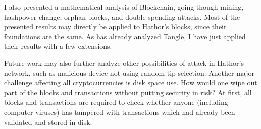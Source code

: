 I also presented a mathematical analysis of Blockchain, going though mining, hashpower change, orphan blocks, and double-spending attacks. Most of the presented results may directly be applied to Hathor's blocks, since their foundations are the same. As \citet{tangle2016} has already analyzed Tangle, I have just applied their results with a few extensions.

Future work may also further analyze other possibilities of attack in Hathor's network, such as malicious device not using random tip selection. Another major challenge affecting all cryptocurrencies is disk space use. How would one wipe out part of the blocks and transactions without putting security in risk? At first, all blocks and transactions are required to check whether anyone (including computer viruses) has tampered with transactions which had already been validated and stored in disk.
